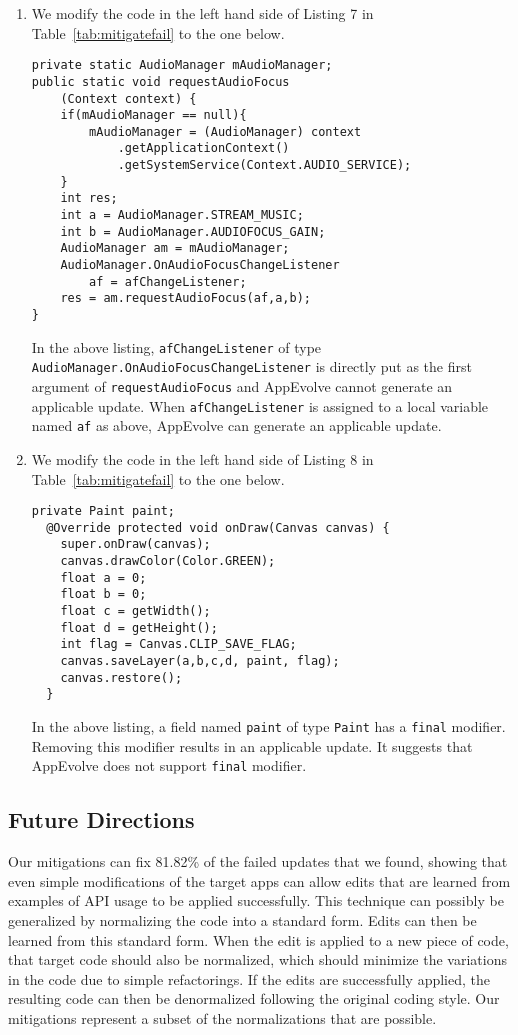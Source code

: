 \begin{enumerate}
\item We modify the code in the left hand side of Listing 7 in Table~\ref{tab:mitigatefail} to the one below.
\begin{lstlisting}[language=text,numbers=none]
private static AudioManager mAudioManager;
public static void requestAudioFocus
    (Context context) {
    if(mAudioManager == null){
        mAudioManager = (AudioManager) context
            .getApplicationContext()
            .getSystemService(Context.AUDIO_SERVICE);
    }
    int res;
    int a = AudioManager.STREAM_MUSIC;
    int b = AudioManager.AUDIOFOCUS_GAIN;
    AudioManager am = mAudioManager;
    AudioManager.OnAudioFocusChangeListener
        af = afChangeListener;
    res = am.requestAudioFocus(af,a,b);
}
\end{lstlisting}
In the above listing, {\tt afChangeListener} of type {\tt AudioManager.OnAudioFocusChangeListener} is directly put as the first argument of {\tt requestAudioFocus} and AppEvolve cannot generate an applicable update. When {\tt afChangeListener} is assigned to a local variable named {\tt af} as above, AppEvolve can generate an applicable update.

\item We modify the code in the left hand side of Listing 8 in Table~\ref{tab:mitigatefail} to the one below.
\begin{lstlisting}[language=text,numbers=none]
private Paint paint;
  @Override protected void onDraw(Canvas canvas) {
    super.onDraw(canvas);
    canvas.drawColor(Color.GREEN);
    float a = 0;
    float b = 0;
    float c = getWidth();
    float d = getHeight();
    int flag = Canvas.CLIP_SAVE_FLAG;
    canvas.saveLayer(a,b,c,d, paint, flag);
    canvas.restore();
  }
\end{lstlisting}
In the above listing, a field named {\tt paint} of type {\tt Paint} has a {\tt final} modifier. Removing this modifier results in an applicable update. It suggests that AppEvolve does not support {\tt final} modifier.
\end{enumerate}


\subsection{Future Directions}
Our mitigations can fix 81.82\% of the failed updates that we found,
showing that even simple modifications of the target apps can allow
edits that are learned from examples of API usage to be applied
successfully. This technique can possibly be generalized by normalizing the
code into a standard form. Edits can then be learned from this standard
form. When the edit is applied to a new piece of code, that target code
should also be normalized, which should minimize the variations in the code
due to simple refactorings. If the edits are successfully applied, the
resulting code can then be denormalized following the original coding
style.  Our mitigations represent a subset of the normalizations that are
possible.

